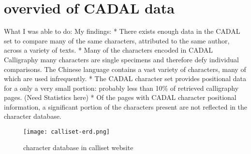 \chapter{overvied of CADAL data}
What I was able to do:
    My findings:
        * There exists enough data in the CADAL set to compare many of the same characters, attributed to the same author, across a variety of texts.
        *  Many of the characters encoded in CADAL Calligraphy many characters are single specimens and therefore defy individual comparisons.  The Chinese language contains a vast variety of characters, many of which are used infrequently.
        *  The CADAL character set provides positional data for a only a very small portion: probably less than 10\% of retrieved calligraphy pages.  (Need Statistics here)
        *  Of the pages with CADAL character positional information, a significant portion of the characters present are not reflected in the character database.
        
    \begin{figure}{}
    \parbox{12cm}{\texttt{[image: calliset-erd.png]}}
    \caption{character database in calliset website}
    \label{character database in calliset website}
    \end{figure}
    
